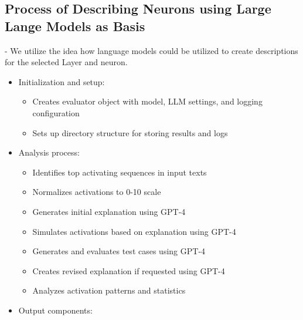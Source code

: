 \documentclass[runninghheads]{llncs}
\begin{document}
\subsection{Process of Describing Neurons using Large Lange Models as Basis}

- We utilize the idea \cite{bills2023language} how language models could be utilized to create descriptions for the selected Layer and neuron. 
\begin{itemize}
    \item Initialization and setup:
    \begin{itemize}
        \item Creates evaluator object with model, LLM settings, and logging configuration
        \item Sets up directory structure for storing results and logs
    \end{itemize}
    \item Analysis process:
    \begin{itemize}
        \item Identifies top activating sequences in input texts
        \item Normalizes activations to 0-10 scale
        \item Generates initial explanation using GPT-4
        \item Simulates activations based on explanation using GPT-4
        \item Generates and evaluates test cases using GPT-4
        \item Creates revised explanation if requested using GPT-4
        \item Analyzes activation patterns and statistics
    \end{itemize}
    \item Output components:
\end{itemize}
\end{document}
